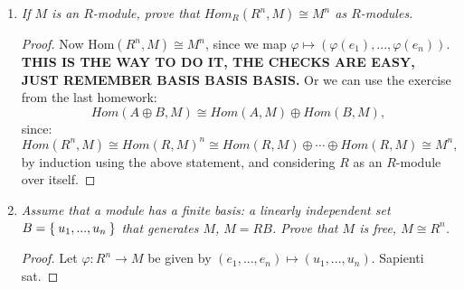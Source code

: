 \documentclass[12pt]{amsbook}
\theoremstyle{plain}
\numberwithin{section}{chapter}
\numberwithin{equation}{chapter}
\theoremstyle{definition}
\theoremstyle{remark}
\renewcommand{\phi}{\varphi}
\begin{document}
\begin{enumerate}[label=\arabic*.]
\begin{proof}
In the above expression, the first equality comes from the definition of addition in $H_A \times H_B$. The second and third equalities comes from the definition of $\Phi$. And we also know: 
$$
\Phi(r(\phi,\psi)) = \Phi((r\phi,r\psi)) = r\phi + r\psi = r(\phi + \psi) = r\Phi((\phi,\psi)),
$$
hence $\Phi$ preserves mult. by $R$, by the definition of scalar multiplication on the $R$-module $H_A \times H_B$, and the definition of $\Phi$. 

\textbf{Surjectivity: } Let $\phi \in H$. Then $\phi:A\times B \to M$. So let $\phi \in H_A$ be given by $\phi(a) = \phi(a,0)$,
and let $\psi \in H_B$ be given by $\phi(b) = \phi(0,b)$. Then we have: $\Phi((\phi,\psi)) = \phi$.  Then $\Phi$ is surjective. 


\textbf{Injectivity: } Let $\Phi((\phi_1,\psi_1)) = \phi_1 + \psi_1 = \phi_2 + \psi_2 = \Phi((\phi_2,\psi_2)) \in H_A \times H_B$. Then note that 
$$
(\phi_1 + \psi_1)(a,0) = \phi_1(a) = \phi_2(a) = (\phi_2 + \psi_2)(a,0),
$$
and the same holds when we let $a = 0$, and use an arbitrary $b$ value, so we get that $\psi_1 = \psi_2$ as well. Hence $\Phi$ is injective. And thus it is an isomorphism. 
\end{proof}

\item \textit{If $M$ is an $R$-module, prove that $Hom_R(R^n,M) \cong M^n$ as $R$-modules. }

\begin{proof}


Now Hom$(R^n,M) \cong M^n$, since we map $\phi \mapsto (\phi(e_1),...,\phi(e_n))$. \textbf{THIS IS THE WAY TO DO IT, THE CHECKS ARE EASY, JUST REMEMBER BASIS BASIS BASIS. }Or we can use the exercise from the last homework:
$$
Hom(A \oplus B,M) \cong Hom(A,M) \oplus Hom(B,M),
$$
since:
$$
Hom(R^n,M) \cong Hom(R,M)^n \cong  Hom(R,M) \oplus \cdots \oplus Hom(R,M) \cong M^n,
$$
by induction using the above statement, and considering $R$ as an $R$-module over itself. 
\end{proof}

\item \textit{Assume that a module has a finite basis: a linearly independent set $B = \Set{u_1,...,u_n}$ that generates $M$, $M = RB$. Prove that $M$ is free, $M \cong R^n$. }\label{B.8}

\begin{proof}
Let $\phi:R^n \to M$ be given by $(e_1,...,e_n) \mapsto (u_1,...,u_n)$. Sapienti sat. 
\end{proof}


\end{enumerate}
\end{document}

